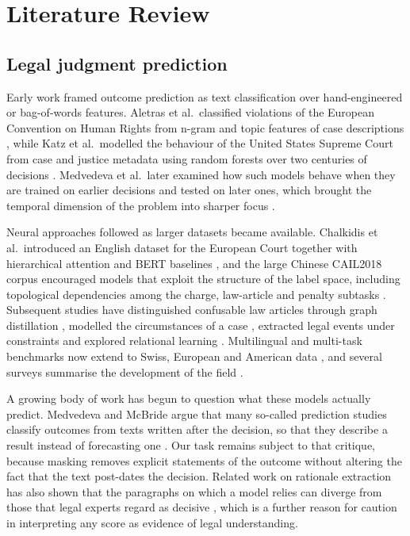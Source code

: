 \documentclass[11pt,a4paper]{article}
\begin{document}
\section{Literature Review}\label{sec:related}
\subsection{Legal judgment prediction}
Early work framed outcome prediction as text classification over hand-engineered or bag-of-words features. Aletras et al.\ classified violations of the European Convention on Human Rights from n-gram and topic features of case descriptions \cite{r1}, while Katz et al.\ modelled the behaviour of the United States Supreme Court from case and justice metadata using random forests over two centuries of decisions \cite{r4}. Medvedeva et al.\ later examined how such models behave when they are trained on earlier decisions and tested on later ones, which brought the temporal dimension of the problem into sharper focus \cite{r2}.

Neural approaches followed as larger datasets became available. Chalkidis et al.\ introduced an English dataset for the European Court together with hierarchical attention and BERT baselines \cite{r3}, and the large Chinese CAIL2018 corpus \cite{r6} encouraged models that exploit the structure of the label space, including topological dependencies among the charge, law-article and penalty subtasks \cite{r5}. Subsequent studies have distinguished confusable law articles through graph distillation \cite{r15}, modelled the circumstances of a case \cite{r36}, extracted legal events under constraints \cite{r37} and explored relational learning \cite{r18}. Multilingual and multi-task benchmarks now extend to Swiss, European and American data \cite{r7,r38,r39}, and several surveys summarise the development of the field \cite{r8,r9}.

A growing body of work has begun to question what these models actually predict. Medvedeva and McBride argue that many so-called prediction studies classify outcomes from texts written after the decision, so that they describe a result instead of forecasting one \cite{r24}. Our task remains subject to that critique, because masking removes explicit statements of the outcome without altering the fact that the text post-dates the decision. Related work on rationale extraction has also shown that the paragraphs on which a model relies can diverge from those that legal experts regard as decisive \cite{r40}, which is a further reason for caution in interpreting any score as evidence of legal understanding.
\end{document}
